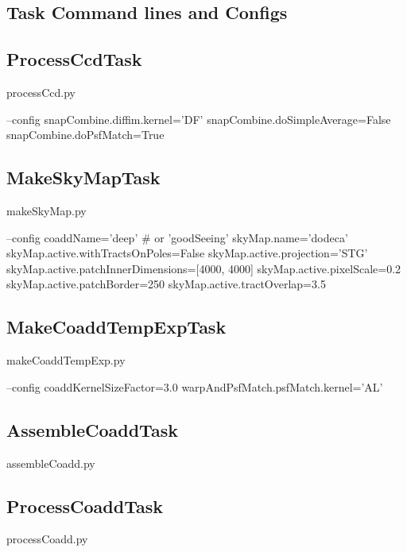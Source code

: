 \documentclass[prd, nofootinbib, floatfix, 11pt,tightenlines,times]{article}
\begin{document}

\clearpage 
\begin{appendices}
\section{Task Command lines and Configs}

\subsection{ProcessCcdTask}
\begin{python}
processCcd.py

--config
snapCombine.diffim.kernel='DF'
snapCombine.doSimpleAverage=False
snapCombine.doPsfMatch=True
\end{python}


\subsection{MakeSkyMapTask}
\begin{python}
makeSkyMap.py

--config
coaddName='deep' # or 'goodSeeing'
skyMap.name='dodeca'
skyMap.active.withTractsOnPoles=False
skyMap.active.projection='STG'
skyMap.active.patchInnerDimensions=[4000, 4000]
skyMap.active.pixelScale=0.2
skyMap.active.patchBorder=250
skyMap.active.tractOverlap=3.5
\end{python}

\subsection{MakeCoaddTempExpTask} 
\begin{python}
makeCoaddTempExp.py

--config
coaddKernelSizeFactor=3.0
warpAndPsfMatch.psfMatch.kernel='AL'
\end{python}

\subsection{AssembleCoaddTask} 
\begin{python}
assembleCoadd.py
\end{python}

\subsection{ProcessCoaddTask} 
\begin{python}
processCoadd.py
\end{python}


\end{appendices}
\end{document}
